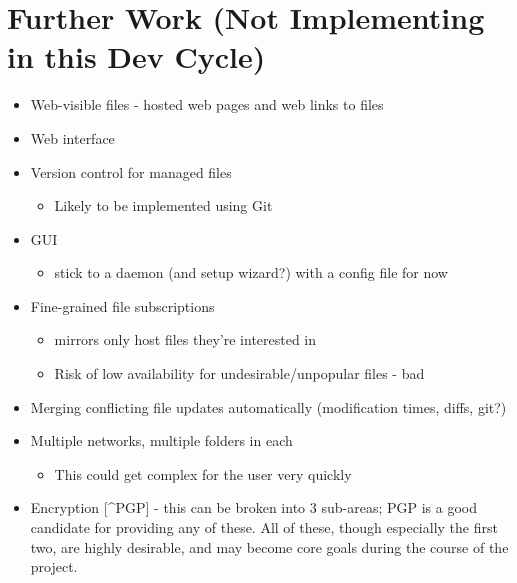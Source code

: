 \documentclass[12pt,a4paper,]{book}
\begin{document}
\section{Further Work (Not Implementing in this Dev
Cycle)}\label{further-work-not-implementing-in-this-dev-cycle}

\begin{itemize}
\itemsep1pt\parskip0pt
\item
  Web-visible files - hosted web pages and web links to files
\item
  Web interface
\item
  Version control for managed files

  \begin{itemize}
  \itemsep1pt\parskip0pt
  \item
    Likely to be implemented using Git
  \end{itemize}
\item
  GUI

  \begin{itemize}
  \itemsep1pt\parskip0pt
  \item
    stick to a daemon (and setup wizard?) with a config file for now
  \end{itemize}
\item
  Fine-grained file subscriptions

  \begin{itemize}
  \itemsep1pt\parskip0pt
  \item
    mirrors only host files they're interested in
  \item
    Risk of low availability for undesirable/unpopular files - bad
  \end{itemize}
\item
  Merging conflicting file updates automatically (modification times,
  diffs, git?)
\item
  Multiple networks, multiple folders in each

  \begin{itemize}
  \itemsep1pt\parskip0pt
  \item
    This could get complex for the user very quickly
  \end{itemize}
\item
  Encryption {[}\^{}PGP{]} - this can be broken into 3 sub-areas; PGP is
  a good candidate for providing any of these. All of these, though
  especially the first two, are highly desirable, and may become core
  goals during the course of the project.


\end{itemize}
\end{document}
